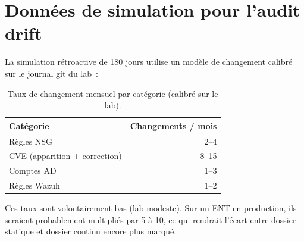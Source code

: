 \section{Données de simulation pour l'audit drift}

La simulation rétroactive de 180 jours utilise un modèle de
changement calibré sur le journal git du lab~:

\begin{table}[h]
\centering
\caption{Taux de changement mensuel par catégorie (calibré sur
le lab).}
\label{tab:churn}
\small
\begin{tabular}{lr}
\toprule
\textbf{Catégorie} & \textbf{Changements / mois} \\
\midrule
Règles NSG & 2--4 \\
CVE (apparition + correction) & 8--15 \\
Comptes AD & 1--3 \\
Règles Wazuh & 1--2 \\
\bottomrule
\end{tabular}
\end{table}

Ces taux sont volontairement bas (lab modeste). Sur un ENT en
production, ils seraient probablement multipliés par 5 à 10, ce
qui rendrait l'écart entre dossier statique et dossier continu
encore plus marqué.
